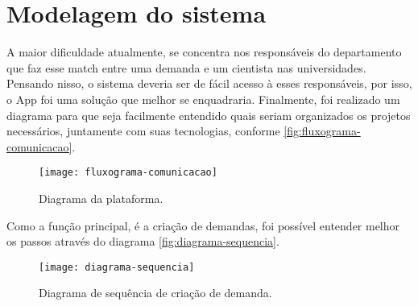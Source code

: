 \section{Modelagem do sistema}\label{sec:modelagemSistema}

A maior dificuldade atualmente, se concentra nos responsáveis do departamento que faz esse match entre uma demanda e um cientista nas universidades.
Pensando nisso, o sistema deveria ser de fácil acesso à esses responsáveis, por isso, o App foi uma solução que melhor se enquadraria. 
Finalmente, foi realizado um diagrama para que seja facilmente entendido quais seriam organizados os projetos necessários, juntamente com suas tecnologias, conforme \autoref{fig:fluxograma-comunicacao}.

\begin{figure}[htpb]
    \captionsetup{width=0.43\textwidth}
    \caption{Diagrama da plataforma.}
    \label{fig:fluxograma-comunicacao}
    \texttt{[image: fluxograma-comunicacao]}
    \fonte{}
\end{figure}

Como a função principal, é a criação de demandas, foi possível entender melhor os passos através do diagrama \autoref{fig:diagrama-sequencia}.

\begin{figure}[htpb]
    \captionsetup{width=0.43\textwidth}
    \caption{Diagrama de sequência de criação de demanda.}
    \label{fig:diagrama-sequencia}
    \texttt{[image: diagrama-sequencia]}
    \fonte{}
\end{figure}

\renewcommand{\labelenumii}{\arabic{enumi}.\arabic{enumii}}
\renewcommand{\labelenumiii}{\arabic{enumi}.\arabic{enumii}.\arabic{enumiii}}
\renewcommand{\labelenumiv}{\arabic{enumi}.\arabic{enumii}.\arabic{enumiii}.\arabic{enumiv}}

